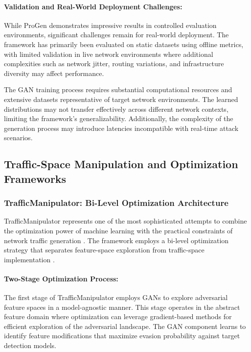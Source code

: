 \paragraph{Validation and Real-World Deployment Challenges:}
While ProGen demonstrates impressive results in controlled evaluation environments, significant challenges remain for real-world deployment. The framework has primarily been evaluated on static datasets using offline metrics, with limited validation in live network environments where additional complexities such as network jitter, routing variations, and infrastructure diversity may affect performance.

The GAN training process requires substantial computational resources and extensive datasets representative of target network environments. The learned distributions may not transfer effectively across different network contexts, limiting the framework's generalizability. Additionally, the complexity of the generation process may introduce latencies incompatible with real-time attack scenarios.

\subsection{Traffic-Space Manipulation and Optimization Frameworks}

\subsubsection{TrafficManipulator: Bi-Level Optimization Architecture}

TrafficManipulator represents one of the most sophisticated attempts to combine the optimization power of machine learning with the practical constraints of network traffic generation \cite{vitorino2025reliable}. The framework employs a bi-level optimization strategy that separates feature-space exploration from traffic-space implementation \cite{vitorino2025reliable}.

\paragraph{Two-Stage Optimization Process:}
The first stage of TrafficManipulator employs GANs to explore adversarial feature spaces in a model-agnostic manner. This stage operates in the abstract feature domain where optimization can leverage gradient-based methods for efficient exploration of the adversarial landscape. The GAN component learns to identify feature modifications that maximize evasion probability against target detection models.


